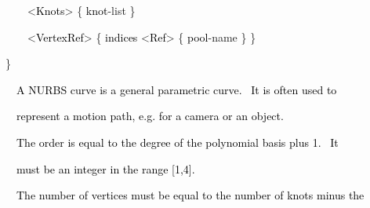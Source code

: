 \documentclass[a4paper]{article}
\newcommand\textstyleOOoComputerKeyWord[1]{\textrm{\textcolor[rgb]{0.0,0.0,0.5019608}{#1}}}
\newcommand\textstyleOOoAssemblerSpecialChar[1]{\textrm{\textcolor[rgb]{0.0,0.5019608,0.0}{#1}}}
\newcommand\textstyleOOoAssemblerIdent[1]{\textrm{\textcolor{black}{#1}}}
\newcommand\textstyleOOoAssemblerDirective[1]{\textrm{\textcolor[rgb]{0.0,0.5019608,1.0}{#1}}}
\begin{document}
{\color{black}
\textstyleOOoComputerKeyWord{\textcolor{black}{\ \ \ \ }}\textstyleOOoAssemblerSpecialChar{{\textless}}\textstyleOOoAssemblerIdent{Knots}\textstyleOOoAssemblerSpecialChar{{\textgreater}}\textstyleOOoComputerKeyWord{\textcolor{black}{
}}\textstyleOOoAssemblerSpecialChar{\{}\textstyleOOoComputerKeyWord{\textcolor{black}{
}}\textstyleOOoAssemblerIdent{knot}\textstyleOOoAssemblerSpecialChar{{}-}\textstyleOOoAssemblerDirective{list}\textstyleOOoComputerKeyWord{\textcolor{black}{
}}\textstyleOOoAssemblerSpecialChar{\}}}

{\color{black}
\textstyleOOoComputerKeyWord{\textcolor{black}{\ \ \ \ }}\textstyleOOoAssemblerSpecialChar{{\textless}}\textstyleOOoAssemblerIdent{VertexRef}\textstyleOOoAssemblerSpecialChar{{\textgreater}}\textstyleOOoComputerKeyWord{\textcolor{black}{
}}\textstyleOOoAssemblerSpecialChar{\{}\textstyleOOoComputerKeyWord{\textcolor{black}{
}}\textstyleOOoAssemblerIdent{indices}\textstyleOOoComputerKeyWord{\textcolor{black}{
}}\textstyleOOoAssemblerSpecialChar{{\textless}}\textstyleOOoAssemblerIdent{Ref}\textstyleOOoAssemblerSpecialChar{{\textgreater}}\textstyleOOoComputerKeyWord{\textcolor{black}{
}}\textstyleOOoAssemblerSpecialChar{\{}\textstyleOOoComputerKeyWord{\textcolor{black}{
}}\textstyleOOoAssemblerIdent{pool}\textstyleOOoAssemblerSpecialChar{{}-}\textstyleOOoAssemblerDirective{name}\textstyleOOoComputerKeyWord{\textcolor{black}{
}}\textstyleOOoAssemblerSpecialChar{\}}\textstyleOOoComputerKeyWord{\textcolor{black}{
}}\textstyleOOoAssemblerSpecialChar{\}}}

{\color{black}
\textstyleOOoAssemblerSpecialChar{\}}}


\bigskip

{\color{black}
\textstyleOOoComputerKeyWord{\textcolor{black}{\ \ A NURBS curve is a general parametric curve. \ It is often used to}}}

{\color{black}
\textstyleOOoComputerKeyWord{\textcolor{black}{\ \ represent a motion path, e.g. for a camera or an object.}}}


\bigskip

{\color{black}
\textstyleOOoComputerKeyWord{\textcolor{black}{\ \ The order is equal to the degree of the polynomial basis plus 1.
\ It}}}

{\color{black}
\textstyleOOoComputerKeyWord{\textcolor{black}{\ \ must be an integer in the range [1,4].}}}


\bigskip

{\color{black}
\textstyleOOoComputerKeyWord{\textcolor{black}{\ \ The number of vertices must be equal to the number of knots minus
the}}}
\end{document}
